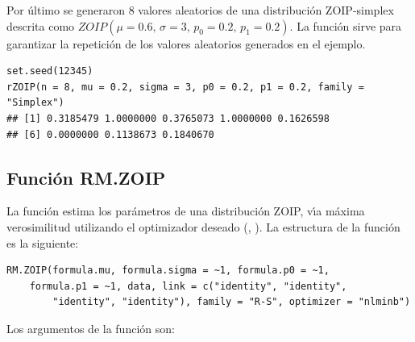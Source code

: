 Por \'{u}ltimo se generaron 8 valores aleatorios de una distribuci\'{o}n ZOIP-simplex descrita como $ZOIP(\mu=0.6, \, \sigma=3, \, p_0=0.2, \, p_1=0.2)$. La funci\'{o}n  sirve para garantizar la repetici\'{o}n de los valores aleatorios generados en el ejemplo.\\

\begin{verbatim}
set.seed(12345)
rZOIP(n = 8, mu = 0.2, sigma = 3, p0 = 0.2, p1 = 0.2, family = "Simplex")
## [1] 0.3185479 1.0000000 0.3765073 1.0000000 0.1626598
## [6] 0.0000000 0.1138673 0.1840670
\end{verbatim}

\subsection{Funci\'{o}n RM.ZOIP}

La funci\'{o}n  estima los par\'{a}metros de una distribuci\'{o}n ZOIP, v\'{\i}a m\'{a}xima verosimilitud utilizando el optimizador deseado (, ). La estructura de la funci\'{o}n  es la siguiente:

\begin{verbatim}
RM.ZOIP(formula.mu, formula.sigma = ~1, formula.p0 = ~1, 
    formula.p1 = ~1, data, link = c("identity", "identity", 
        "identity", "identity"), family = "R-S", optimizer = "nlminb")
\end{verbatim}

Los argumentos de la funci\'{o}n  son:

